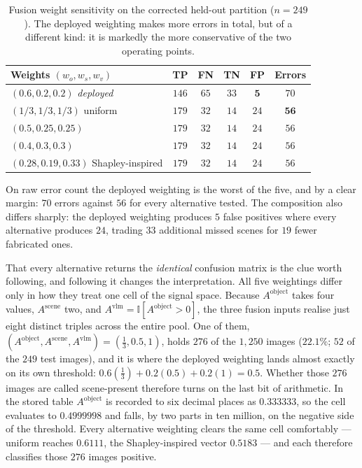 \documentclass[12pt,a4paper]{report}
\begin{document}
\begin{table}[!htbp]
\centering
\caption[Fusion weight sensitivity on the corrected held-out partition ($n=249$)]{Fusion weight sensitivity on the corrected held-out partition ($n=249$). The deployed weighting makes more errors in total, but of a different kind: it is markedly the more conservative of the two operating points.}
\label{tab:weight_sensitivity}
\small
\begin{tabular}{@{}l c c c c c@{}}
\toprule
\textbf{Weights $(w_o, w_s, w_v)$} & \textbf{TP} & \textbf{FN} & \textbf{TN} & \textbf{FP} & \textbf{Errors} \\
\midrule
$(0.6, 0.2, 0.2)$ \emph{deployed} & $146$ & $65$ & $33$ & $\mathbf{5}$ & $70$ \\
$(1/3, 1/3, 1/3)$ uniform & $179$ & $32$ & $14$ & $24$ & $\mathbf{56}$ \\
$(0.5, 0.25, 0.25)$ & $179$ & $32$ & $14$ & $24$ & $56$ \\
$(0.4, 0.3, 0.3)$ & $179$ & $32$ & $14$ & $24$ & $56$ \\
$(0.28, 0.19, 0.33)$ Shapley-inspired & $179$ & $32$ & $14$ & $24$ & $56$ \\
\bottomrule
\end{tabular}
\end{table}

On raw error count the deployed weighting is the worst of the five, and by a clear margin: $70$
errors against $56$ for every alternative tested. The composition also differs sharply: the
deployed weighting produces $5$ false positives where every alternative produces $24$, trading
$33$ additional missed scenes for $19$ fewer fabricated ones.

That every alternative returns the \emph{identical} confusion matrix is the clue worth following,
and following it changes the interpretation. All five weightings differ only in how they treat one
cell of the signal space. Because $A^{\text{object}}$ takes four values, $A^{\text{scene}}$ two,
and $A^{\text{vlm}} = \mathbb{I}[A^{\text{object}}>0]$, the three fusion inputs realise just eight
distinct triples across the entire pool. One of them, $(A^{\text{object}}, A^{\text{scene}},
A^{\text{vlm}}) = (\tfrac13, 0.5, 1)$, holds $276$ of the $1{,}250$ images ($22.1\%$; $52$ of the
$249$ test images), and it is where the deployed weighting lands almost exactly on its own
threshold: $0.6(\tfrac13) + 0.2(0.5) + 0.2(1) = 0.5$. Whether those $276$ images are called
scene-present therefore turns on the last bit of arithmetic. In the stored table
$A^{\text{object}}$ is recorded to six decimal places as $0.333333$, so the cell evaluates to
$0.4999998$ and falls, by two parts in ten million, on the negative side of the threshold. Every
alternative weighting clears the same cell comfortably --- uniform reaches $0.6111$, the
Shapley-inspired vector $0.5183$ --- and each therefore classifies those $276$ images positive.
\end{document}
